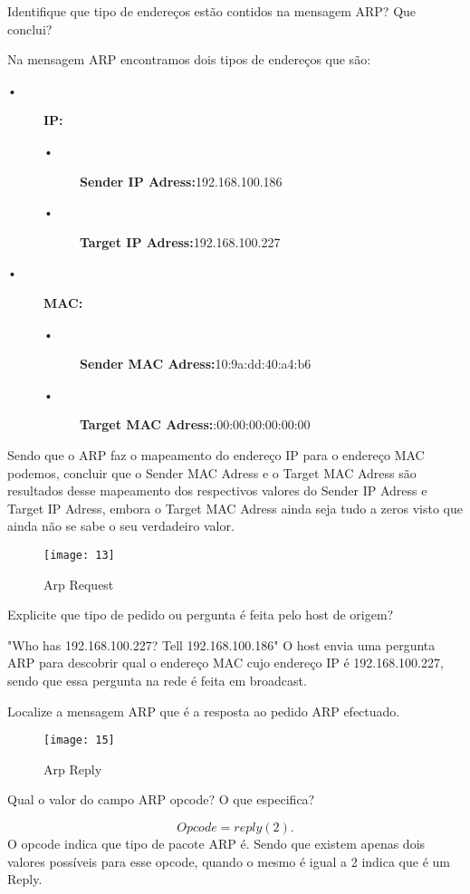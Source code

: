 \documentclass{exam}
\begin{document}
\begin{questions}
\question Identifique que tipo de endereços estão contidos na mensagem ARP? Que conclui?
\begin{solution}
Na mensagem ARP encontramos dois tipos de endereços que são:
\begin{description}
	\item[•] \textbf{IP:}
	\begin{description}
		\item[•] \textbf{Sender IP Adress:}192.168.100.186
		\item[•] \textbf{Target IP Adress:}192.168.100.227
	\end{description}	
	\item[•] \textbf{MAC:} 
	\begin{description}
		\item[•] \textbf{Sender MAC Adress:}10:9a:dd:40:a4:b6
		\item[•] \textbf{Target MAC Adress:}:00:00:00:00:00:00
	\end{description}	
\end{description}
Sendo que o ARP faz o mapeamento do endereço IP para o endereço MAC podemos, concluir que o Sender MAC Adress e o Target MAC Adress são resultados desse mapeamento dos respectivos valores do Sender IP Adress e Target IP Adress, embora o Target MAC Adress ainda seja tudo a zeros visto que ainda não se sabe o seu verdadeiro valor.
\end{solution}
\begin{figure}[H]
\centering\texttt{[image: 13]} 
\caption{\label{fig:controller}Arp Request}
\end{figure}

\question Explicite que tipo de pedido ou pergunta é feita pelo host de origem?
\begin{solution}
"Who has 192.168.100.227? Tell 192.168.100.186"
 O host envia uma pergunta ARP para descobrir qual o endereço MAC cujo endereço IP é  192.168.100.227, sendo que essa pergunta na rede é feita em
 broadcast.
\end{solution}

\question Localize a mensagem ARP que é a resposta ao pedido ARP efectuado.
\begin{figure}[H]
\centering\texttt{[image: 15]} 
\caption{\label{fig:controller}Arp Reply}
\end{figure}

\question Qual o valor do campo ARP opcode? O que especifica?
\begin{solution}
 \begin{equation}
Opcode= reply (2).
\end{equation}
O opcode indica que tipo de pacote ARP é. Sendo que existem apenas dois valores possíveis para esse opcode, quando o mesmo é igual a 2 indica que é um Reply.
\end{solution}


\end{questions}
\end{document}
